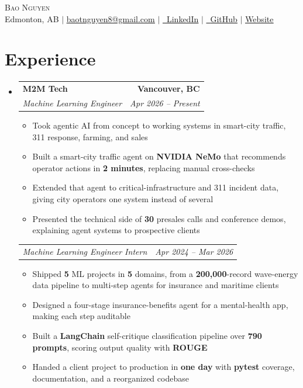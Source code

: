 \documentclass[letterpaper,11pt]{article}
\makeatletter
\newcommand{\resumeItem}[1]{
  \item\small{
    {#1 \vspace{-3pt}}
  }
}
\newcommand{\resumeSubheading}[4]{
  \vspace{-3pt}\item
    \begin{tabular*}{1.0\textwidth}[t]{l@{\extracolsep{\fill}}r}
      \textbf{#1} & \textbf{\small #2} \\
      \textit{\small#3} & \textit{\small #4} \\
    \end{tabular*}\vspace{-7pt}
}
\newcommand{\resumeSubheadingContinue}[2]{
  \vspace{-3pt}
    \begin{tabular*}{1.0\textwidth}[t]{l@{\extracolsep{\fill}}r}
      \textit{\small#1} & \textit{\small #2} \\
    \end{tabular*}\vspace{-7pt}
}
\newcommand{\resumeSubHeadingListStart}{\begin{itemize}[leftmargin=0.0in, label={}]}
\newcommand{\resumeSubHeadingListEnd}{\end{itemize}}
\newcommand{\resumeItemListStart}{\begin{itemize}}
\newcommand{\resumeItemListEnd}{\end{itemize}\vspace{0pt}}
\makeatother
\begin{document}
    \begin{center}
        {\Huge\scshape Bao Nguyen}
        \\[0.125cm]
        Edmonton, AB $|$
        \href{mailto:baotnguyen8@gmail.com}{\underline{baotnguyen8@gmail.com}} $|$
        \href{https://www.linkedin.com/in/bao-thanh-nguyen}{\faLinkedin\ \underline{LinkedIn}} $|$
        \href{https://github.com/BaoTNguyen}{\faGithub\ \underline{GitHub}} $|$
        \href{https://lnksy.bio/bao-nguyen}{\underline{Website}}
    \end{center}

\section{Experience}
    \resumeSubHeadingListStart
        \resumeSubheading
        {M2M Tech}{Vancouver, BC}
        {Machine Learning Engineer}{Apr 2026 -- Present}
            \resumeItemListStart
                \resumeItem{Took agentic AI from concept to working systems in smart-city traffic, 311 response, farming, and sales}
                \resumeItem{Built a smart-city traffic agent on \textbf{NVIDIA NeMo} that recommends operator actions in \textbf{2 minutes}, replacing manual cross-checks}
                \resumeItem{Extended that agent to critical-infrastructure and 311 incident data, giving city operators one system instead of several}
                \resumeItem{Presented the technical side of \textbf{30} presales calls and conference demos, explaining agent systems to prospective clients}
            \resumeItemListEnd

            \resumeSubheadingContinue
            {Machine Learning Engineer Intern}{Apr 2024 -- Mar 2026}
            \resumeItemListStart
                \resumeItem{Shipped \textbf{5} ML projects in \textbf{5} domains, from a \textbf{200,000}-record wave-energy data pipeline to multi-step agents for insurance and maritime clients}
                \resumeItem{Designed a four-stage insurance-benefits agent for a mental-health app, making each step auditable}
                \resumeItem{Built a \textbf{LangChain} self-critique classification pipeline over \textbf{790 prompts}, scoring output quality with \textbf{ROUGE}}
                \resumeItem{Handed a client project to production in \textbf{one day} with \textbf{pytest} coverage, documentation, and a reorganized codebase}
            \resumeItemListEnd
    \resumeSubHeadingListEnd
\end{document}
